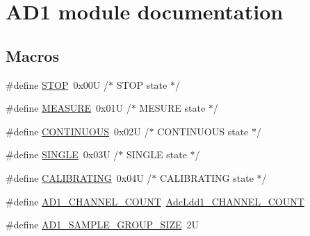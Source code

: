 \hypertarget{group___a_d1__module}{}\section{A\+D1 module documentation}
\label{group___a_d1__module}
\subsection*{Macros}
\begin{DoxyCompactItemize}
\item 
\#define \hyperlink{group___a_d1__module_gae19b6bb2940d2fbe0a79852b070eeafd}{S\+T\+OP}~0x00\+U          /$\ast$ S\+T\+O\+P state           $\ast$/
\item 
\#define \hyperlink{group___a_d1__module_ga4691aeea76a4f3a3bdbff68ce5ab56a1}{M\+E\+A\+S\+U\+RE}~0x01\+U          /$\ast$ M\+E\+S\+U\+R\+E state         $\ast$/
\item 
\#define \hyperlink{group___a_d1__module_gacf80826c205230fbc6a84ab9c46ff9af}{C\+O\+N\+T\+I\+N\+U\+O\+US}~0x02\+U          /$\ast$ C\+O\+N\+T\+I\+N\+U\+O\+U\+S state     $\ast$/
\item 
\#define \hyperlink{group___a_d1__module_gaae597f206a8cf88b5a0593f39044b937}{S\+I\+N\+G\+LE}~0x03\+U          /$\ast$ S\+I\+N\+G\+L\+E state         $\ast$/
\item 
\#define \hyperlink{group___a_d1__module_ga26c3762ed87f9dd7c55b86b162e8461f}{C\+A\+L\+I\+B\+R\+A\+T\+I\+NG}~0x04\+U          /$\ast$ C\+A\+L\+I\+B\+R\+A\+T\+I\+N\+G state    $\ast$/
\item 
\#define \hyperlink{group___a_d1__module_ga323a6cae0ef39913d475643e325ab53d}{A\+D1\+\_\+\+C\+H\+A\+N\+N\+E\+L\+\_\+\+C\+O\+U\+NT}~\hyperlink{group___adc_ldd1__module_ga1fd3f1eef1222a8b6fd2b9f83736a49a}{Adc\+Ldd1\+\_\+\+C\+H\+A\+N\+N\+E\+L\+\_\+\+C\+O\+U\+NT}
\item 
\#define \hyperlink{group___a_d1__module_ga1eb5337254a206f5ec353e3eb156bcd0}{A\+D1\+\_\+\+S\+A\+M\+P\+L\+E\+\_\+\+G\+R\+O\+U\+P\+\_\+\+S\+I\+ZE}~2U
\end{DoxyCompactItemize}
